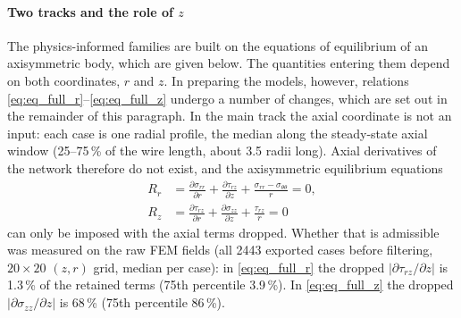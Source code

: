 \documentclass[subscriptcorrection,upint,varvw,barcolor=Goldenrod3,mathalfa=cal=euler,balance,hyphenate,french,pdf-a]{asmejour} %
\begin{document}
\paragraph{Two tracks and the role of \texorpdfstring{$z$}{z}}
The physics-informed families are built on the equations of equilibrium of an
axisymmetric body, which are given below. The quantities entering them depend
on both coordinates, $r$ and $z$. In preparing the models, however, relations
\eqref{eq:eq_full_r}--\eqref{eq:eq_full_z} undergo a number of changes, which
are set out in the remainder of this paragraph.
In the main track the axial coordinate is not an input: each case is one radial
profile, the median along the steady-state axial window (25--75\,\% of the wire
length, about 3.5 radii long).
Axial derivatives of the network therefore do not exist, and the axisymmetric
equilibrium equations
\begin{align}
  R_r &= \frac{\partial\sigma_{rr}}{\partial r}
        + \frac{\partial\tau_{rz}}{\partial z}
        + \frac{\sigma_{rr}-\sigma_{\theta\theta}}{r} = 0, \label{eq:eq_full_r}\\
  R_z &= \frac{\partial\tau_{rz}}{\partial r}
        + \frac{\partial\sigma_{zz}}{\partial z}
        + \frac{\tau_{rz}}{r} = 0 \label{eq:eq_full_z}
\end{align}
can only be imposed with the axial terms dropped. Whether that is admissible was
measured on the raw FEM fields (all 2443 exported cases before filtering, $20\times20$ $(z,r)$ grid, median per
case): in \eqref{eq:eq_full_r} the dropped $|\partial\tau_{rz}/\partial z|$ is
1.3\,\% of the retained terms (75th percentile 3.9\,\%). In \eqref{eq:eq_full_z}
the dropped $|\partial\sigma_{zz}/\partial z|$ is 68\,\% (75th percentile 86\,\%).
\end{document}
